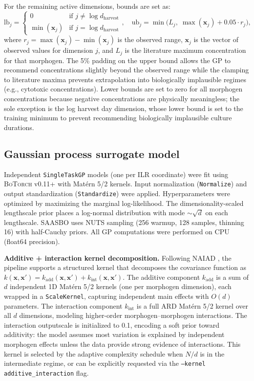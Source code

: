 \documentclass[times,twoside]{zHenriquesLab-StyleBioRxiv}
\newcommand{\botorch}{\textsc{BoTorch}}
\begin{document}
For the remaining active dimensions, bounds are set as:
\begin{equation}
  \text{lb}_j = \begin{cases} 0 & \text{if } j \neq \log d_\text{harvest} \\ \min(\bm{x}_j) & \text{if } j = \log d_\text{harvest} \end{cases}, \quad
  \text{ub}_j = \min\!\bigl(L_j,\; \max(\bm{x}_j) + 0.05 \cdot r_j\bigr),
\end{equation}
where $r_j = \max(\bm{x}_j) - \min(\bm{x}_j)$ is the observed range, $\bm{x}_j$ is the vector of observed values for dimension $j$, and $L_j$ is the literature maximum concentration for that morphogen. The 5\% padding on the upper bound allows the GP to recommend concentrations slightly beyond the observed range while the clamping to literature maxima prevents extrapolation into biologically implausible regimes (e.g., cytotoxic concentrations). Lower bounds are set to zero for all morphogen concentrations because negative concentrations are physically meaningless; the sole exception is the log harvest day dimension, whose lower bound is set to the training minimum to prevent recommending biologically implausible culture durations.

\subsection*{Gaussian process surrogate model}

Independent \texttt{SingleTaskGP} models (one per ILR coordinate) were fit using \botorch{} v0.11+ \cite{Balandat2020botorch} with Mat\'{e}rn 5/2 kernels. Input normalization (\texttt{Normalize}) and output standardization (\texttt{Standardize}) were applied. Hyperparameters were optimized by maximizing the marginal log-likelihood. The dimensionality-scaled lengthscale prior \cite{Hvarfner2024} places a log-normal distribution with mode $\sim\!\sqrt{d}$ on each lengthscale. SAASBO \cite{Eriksson2021saasbo} uses NUTS sampling (256 warmup, 128 samples, thinning 16) with half-Cauchy priors. All GP computations were performed on CPU (float64 precision).

\textbf{Additive + interaction kernel decomposition.} Following NAIAD \cite{Qin2025naiad}, the pipeline supports a structured kernel that decomposes the covariance function as $k(\bm{x}, \bm{x}') = k_\text{add}(\bm{x}, \bm{x}') + k_\text{int}(\bm{x}, \bm{x}')$. The additive component $k_\text{add}$ is a sum of $d$ independent 1D Mat\'{e}rn 5/2 kernels (one per morphogen dimension), each wrapped in a \texttt{ScaleKernel}, capturing independent main effects with $O(d)$ parameters. The interaction component $k_\text{int}$ is a full ARD Mat\'{e}rn 5/2 kernel over all $d$ dimensions, modeling higher-order morphogen--morphogen interactions. The interaction outputscale is initialized to 0.1, encoding a soft prior toward additivity: the model assumes most variation is explained by independent morphogen effects unless the data provide strong evidence of interactions. This kernel is selected by the adaptive complexity schedule when $N/d$ is in the intermediate regime, or can be explicitly requested via the \texttt{--kernel additive\_interaction} flag.
\end{document}
